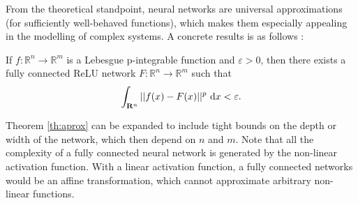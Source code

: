 From the theoretical standpoint, neural networks are universal approximations (for sufficiently well-behaved functions), which makes them especially appealing in the modelling of complex systems. A concrete results is as follows \cite{universal_aprox}:

\begin{theorem}\label{th:aprox}

    If $f\colon \mathbb{R}^n \to \mathbb{R}^m$ is a Lebesgue p-integrable function and $\varepsilon>0$, then there exists a fully connected ReLU network $F\colon \mathbb{R}^n \to \mathbb{R}^m$ such that
    $$
        \int_{\mathbf{R}^n}||f(x)-F(x) ||^p\ \differential x <\varepsilon.
    $$
\end{theorem}
Theorem \ref{th:aprox} can be expanded to include tight bounds on the depth or width of the network, which then depend on $n$ and $m$. Note that all the complexity of a fully connected neural network is generated by the non-linear activation function. With a linear activation function, a fully connected networks would be an affine transformation, which cannot approximate arbitrary non-linear functions.


